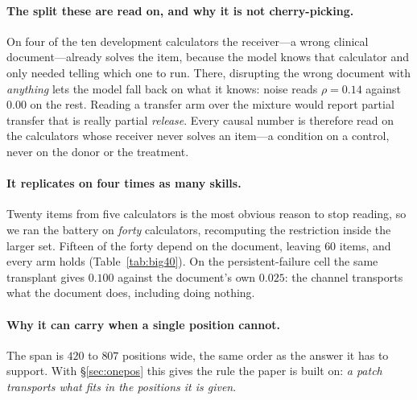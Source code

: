 \documentclass{article}
\begin{document}
\paragraph{The split these are read on, and why it is not cherry-picking.} On
four of the ten development calculators the receiver---a wrong clinical
document---already solves the item, because the model knows that calculator and
only needed telling which one to run. There, disrupting the wrong document with
\emph{anything} lets the model fall back on what it knows: noise reads
$\rho = 0.14$ against $0.00$ on the rest. Reading a transfer arm over the
mixture would report partial transfer that is really partial \emph{release}.
Every causal number is therefore read on the calculators whose receiver never
solves an item---a condition on a control, never on the donor or the treatment.

\paragraph{It replicates on four times as many skills.} Twenty items from five
calculators is the most obvious reason to stop reading, so we ran the battery on
\emph{forty} calculators, recomputing the restriction inside the larger set.
Fifteen of the forty depend on the document, leaving $60$ items, and every arm
holds (Table~\ref{tab:big40}). On the persistent-failure cell the same
transplant gives $0.100$ against the document's own $0.025$: the channel
transports what the document does, including doing nothing.

\begin{table}[t]
\caption{The span battery on forty calculators. The restricted split---the
fifteen calculators a wrong document never rescues---is recomputed inside this
set, so no number is inherited from the ten-calculator version. Intervals are
bootstrapped over calculators. The last two rows are the instrument: writing the
receiver's own states back into it, and not patching at all.}
\label{tab:big40}
\centering
\small

\end{table}

\paragraph{Why it can carry when a single position cannot.} The span is $420$ to
$807$ positions wide, the same order as the answer it has to support. With
\S\ref{sec:onepos} this gives the rule the paper is built on: \emph{a patch
transports what fits in the positions it is given}.
\end{document}
